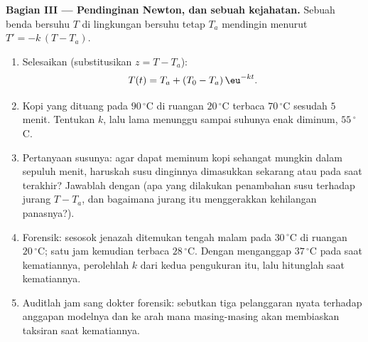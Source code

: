 \begin{problem}
\medskip
\noindent\textbf{Bagian III --- Pendinginan Newton, dan sebuah kejahatan.}
Sebuah benda bersuhu $T$ di lingkungan bersuhu tetap $T_a$
mendingin menurut $T' = -k\,(T - T_a)$.
\begin{enumerate}[resume]
  \item Selesaikan  (substitusikan $z = T - T_a$):
        \[
        T(t) = T_a + (T_0 - T_a)\,\eu^{-kt} .
        \]
  \item Kopi yang dituang pada $90\,^\circ$C di ruangan $20\,^\circ$C
        terbaca $70\,^\circ$C sesudah $5$ menit. Tentukan $k$,
        lalu lama menunggu sampai suhunya enak diminum,
        $55\,^\circ$C.
  \item Pertanyaan susunya: agar dapat meminum kopi sehangat mungkin
        dalam sepuluh menit, haruskah susu dinginnya dimasukkan sekarang atau
        pada saat terakhir? Jawablah dengan  (apa yang
        dilakukan penambahan susu terhadap jurang $T - T_a$, dan bagaimana
        jurang itu menggerakkan kehilangan panasnya?).
  \item Forensik: sesosok jenazah ditemukan tengah malam pada
        $30\,^\circ$C di ruangan $20\,^\circ$C; satu jam kemudian
        terbaca $28\,^\circ$C. Dengan menganggap $37\,^\circ$C pada
        saat kematiannya, perolehlah $k$ dari kedua pengukuran itu,
        lalu hitunglah saat kematiannya.
  \item Auditlah jam sang dokter forensik: sebutkan tiga pelanggaran nyata
        terhadap anggapan modelnya dan ke arah mana masing-masing
        akan membiaskan taksiran saat kematiannya.
\end{enumerate}


\end{problem}

